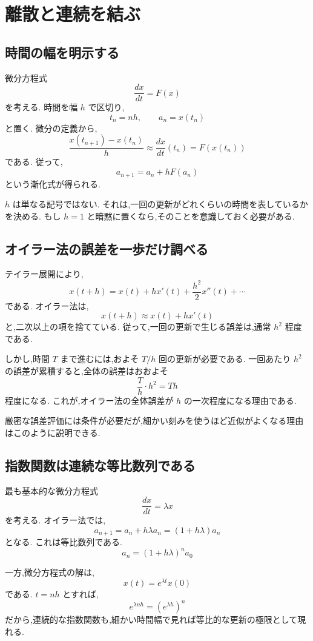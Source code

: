 
\section{離散と連続を結ぶ}

\subsection{時間の幅を明示する}

微分方程式
\[
  \frac{dx}{dt}=F(x)
\]
を考える.
時間を幅 $h$ で区切り,
\[
  t_n=nh,\qquad a_n=x(t_n)
\]
と置く.
微分の定義から,
\[
  \frac{x(t_{n+1})-x(t_n)}h
  \approx \frac{dx}{dt}(t_n)
  =F(x(t_n))
\]
である.
従って,
\[
  a_{n+1}=a_n+hF(a_n)
\]
という漸化式が得られる.

$h$ は単なる記号ではない.
それは,一回の更新がどれくらいの時間を表しているかを決める.
もし $h=1$ と暗黙に置くなら,そのことを意識しておく必要がある.

\subsection{オイラー法の誤差を一歩だけ調べる}

テイラー展開により,
\[
  x(t+h)
  =x(t)+hx'(t)+\frac{h^2}{2}x''(t)+\cdots
\]
である.
オイラー法は,
\[
  x(t+h)\approx x(t)+hx'(t)
\]
と,二次以上の項を捨てている.
従って,一回の更新で生じる誤差は,通常 $h^2$ 程度である.

しかし,時間 $T$ まで進むには,およそ $T/h$ 回の更新が必要である.
一回あたり $h^2$ の誤差が累積すると,全体の誤差はおおよそ
\[
  \frac{T}{h}\cdot h^2=Th
\]
程度になる.
これが,オイラー法の全体誤差が $h$ の一次程度になる理由である.

厳密な誤差評価には条件が必要だが,細かい刻みを使うほど近似がよくなる理由はこのように説明できる.

\subsection{指数関数は連続な等比数列である}

最も基本的な微分方程式
\[
  \frac{dx}{dt}=\lambda x
\]
を考える.
オイラー法では,
\[
  a_{n+1}=a_n+h\lambda a_n
  =(1+h\lambda)a_n
\]
となる.
これは等比数列である.
\[
  a_n=(1+h\lambda)^n a_0
\]

一方,微分方程式の解は,
\[
  x(t)=e^{\lambda t}x(0)
\]
である.
$t=nh$ とすれば,
\[
  e^{\lambda nh}=\left(e^{\lambda h}\right)^n
\]
だから,連続的な指数関数も,細かい時間幅で見れば等比的な更新の極限として現れる.

